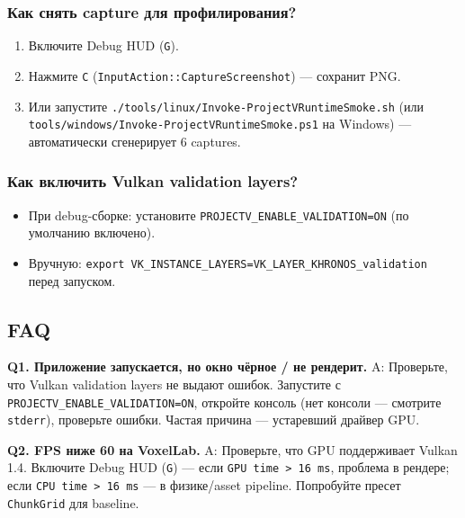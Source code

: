 \subsubsection{Как снять capture для профилирования?}\label{KT-3.1_User_Guide-ux43aux430ux43a-ux441ux43dux44fux442ux44c-capture-ux434ux43bux44f-ux43fux440ux43eux444ux438ux43bux438ux440ux43eux432ux430ux43dux438ux44f}

\begin{enumerate}
\def\labelenumi{\arabic{enumi}.}
\tightlist
\item
  Включите Debug HUD (\texttt{G}).
\item
  Нажмите \texttt{C} (\texttt{InputAction::CaptureScreenshot}) --- сохранит PNG.
\item
  Или запустите \texttt{./tools/linux/Invoke-ProjectVRuntimeSmoke.sh} (или \texttt{tools/windows/Invoke-ProjectVRuntimeSmoke.ps1} на Windows) --- автоматически сгенерирует 6 captures.
\end{enumerate}

\subsubsection{Как включить Vulkan validation layers?}\label{KT-3.1_User_Guide-ux43aux430ux43a-ux432ux43aux43bux44eux447ux438ux442ux44c-vulkan-validation-layers}

\begin{itemize}
\tightlist
\item
  При debug-сборке: установите \texttt{PROJECTV\_ENABLE\_VALIDATION=ON} (по умолчанию включено).
\item
  Вручную: \texttt{export\ VK\_INSTANCE\_LAYERS=VK\_LAYER\_KHRONOS\_validation} перед запуском.
\end{itemize}

\subsection{FAQ}\label{KT-3.1_User_Guide-faq}

\textbf{Q1. Приложение запускается, но окно чёрное / не рендерит.}
A: Проверьте, что Vulkan validation layers не выдают ошибок. Запустите с \texttt{PROJECTV\_ENABLE\_VALIDATION=ON}, откройте консоль (нет консоли --- смотрите \texttt{stderr}), проверьте ошибки. Частая причина --- устаревший драйвер GPU.

\textbf{Q2. FPS ниже 60 на VoxelLab.}
A: Проверьте, что GPU поддерживает Vulkan 1.4. Включите Debug HUD (\texttt{G}) --- если \texttt{GPU\ time\ \textgreater{}\ 16\ ms}, проблема в рендере; если \texttt{CPU\ time\ \textgreater{}\ 16\ ms} --- в физике/asset pipeline. Попробуйте пресет \texttt{ChunkGrid} для baseline.

